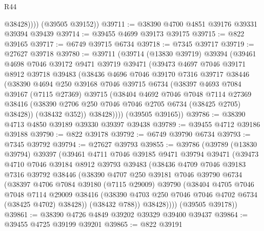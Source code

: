 \begin{lexlean}{R44}
\begin{coremodule}
{              @38428))))
      (@39505 @39152))
@39711 := @38390 @4700 @4851 @39176 @39331 @39394 @39439
@39714 := @39455 @4699 @39173 @39175
@39715 := @822 @39165
@39717 := @6749 @39715 @6734
@39718 := @7345 @39717
@39719 := @27627 @39718
@39780 := @39711
    (@39714
      (@13830 @39719)
      @39394
      (@39461
        @4698
        @7046
        @39172
        @9471
        @39719
        @39471
        (@39473
          @4697
          @7046
          @39171
          @8912
          @39718
          @39483
          (@38436
            @4696
            @7046
            @39170
            @7316
            @39717
            @38446
            (@38390
              @4694
              @250
              @39168
              @7046
              @39715
              @6734
              (@38397
                @4693
                @7084
                @39167
                (@7115 @27369)
                @39715
                (@38404
                  @4692
                  @7046
                  @7048
                  @7114
                  @27369
                  @38416
                  (@38390 @2706 @250 @7046 @7046 @2705 @6734 (@38425 @2705) @38428))
                (@38432 @352))
              @38428))))
      (@39505 @39165))
@39786 := @38390 @4713 @4850 @39189 @39330 @39397 @39438
@39789 := @39455 @4712 @39186 @39188
@39790 := @822 @39178
@39792 := @6749 @39790 @6734
@39793 := @7345 @39792
@39794 := @27627 @39793
@39855 := @39786
    (@39789
      (@13830 @39794)
      @39397
      (@39461
        @4711
        @7046
        @39185
        @9471
        @39794
        @39471
        (@39473
          @4710
          @7046
          @39184
          @8912
          @39793
          @39483
          (@38436
            @4709
            @7046
            @39183
            @7316
            @39792
            @38446
            (@38390
              @4707
              @250
              @39181
              @7046
              @39790
              @6734
              (@38397
                @4706
                @7084
                @39180
                (@7115 @29009)
                @39790
                (@38404
                  @4705
                  @7046
                  @7048
                  @7114
                  @29009
                  @38416
                  (@38390 @4703 @250 @7046 @7046 @4702 @6734 (@38425 @4702) @38428))
                (@38432 @788))
              @38428))))
      (@39505 @39178))
@39861 := @38390 @4726 @4849 @39202 @39329 @39400 @39437
@39864 := @39455 @4725 @39199 @39201
@39865 := @822 @39191
}
\end{coremodule}
\end{lexlean}
